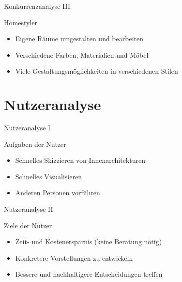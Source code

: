 \documentclass[presentation,bigger,aspectratio=169]{beamer}
\begin{document}
\begin{frame}[label={sec:org5f75ebe}]{Konkurrenzanalyse III}
\begin{block}{Homestyler}
\begin{itemize}
\item Eigene Räume umgestalten und bearbeiten
\item Verschiedene Farben, Materialien und Möbel
\item Viele Gestaltungsmöglichkeiten in verschiedenen Stilen
\end{itemize}
\end{block}
\end{frame}
\section{Nutzeranalyse}
\label{sec:orgb7cc69e}
\begin{frame}[label={sec:orgbfe5b95}]{\vspace{2.2cm}\begin{center}\MakeUppercase{\insertsection}\end{center}}
\end{frame}

\begin{frame}[label={sec:org514bfce}]{Nutzeranalyse I}
\begin{block}{Aufgaben der Nutzer}
\begin{itemize}
\item Schnelles Skizzieren von Innenarchitekturen
\item Schnelles Visualisieren
\item Anderen Personen vorführen
\end{itemize}
\end{block}
\end{frame}
\begin{frame}[label={sec:org900aca2}]{Nutzeranalyse II}
\begin{block}{Ziele der Nutzer}
\begin{itemize}
\item Zeit- und Kostenersparnis (keine Beratung nötig)
\item Konkretere Vorstellungen zu entwickeln
\item Bessere und nachhaltigere Entscheidungen treffen
\end{itemize}
\end{block}
\end{frame}
\end{document}
